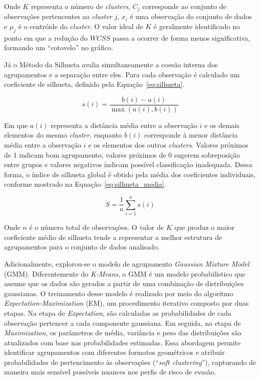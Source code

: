 Onde $K$ representa o número de \textit{clusters}, $C_j$ corresponde ao conjunto de observações pertencentes ao \textit{cluster} $j$, $x_i$ é uma observação do conjunto de dados e $\mu_j$ é o centróide do \textit{cluster}. O valor ideal de $K$ é geralmente identificado no ponto em que a redução do $WCSS$ passa a ocorrer de forma menos significativa, formando um ``cotovelo'' no gráfico.

Já o Método da Silhueta avalia simultaneamente a coesão interna dos agrupamentos e a separação entre eles. Para cada observação é calculado um coeficiente de silhueta, definido pela Equação~\ref{eq:silhueta}.

\begin{equation}
\label{eq:silhueta}
s(i) = \frac{b(i) - a(i)}{\max(a(i), b(i))}
\end{equation}

Em que $a(i)$ representa a distância média entre a observação $i$ e os demais elementos do mesmo \textit{cluster}, enquanto $b(i)$ corresponde à menor distância média entre a observação $i$ e os elementos dos outros \textit{clusters}. Valores próximos de 1 indicam bom agrupamento, valores próximos de 0 sugerem sobreposição entre grupos e valores negativos indicam possível classificação inadequada. Dessa forma, o índice de silhueta global é obtido pela média dos coeficientes individuais, conforme mostrado na Equação~\ref{eq:silhueta_media}.

\begin{equation}
\label{eq:silhueta_media}
S = \frac{1}{n}\sum_{i=1}^{n}s(i)
\end{equation}

Onde $n$ é o número total de observações. O valor de $K$ que produz o maior coeficiente médio de silhueta tende a representar a melhor estrutura de agrupamentos para o conjunto de dados analisado.

Adicionalmente, explorou-se o modelo de agrupamento \textit{Gaussian Mixture Model} (GMM). Diferentemente do \textit{K-Means}, o GMM é um modelo probabilístico que assume que os dados são gerados a partir de uma combinação de distribuições gaussianas. O treinamento desse modelo é realizado por meio do algoritmo \textit{Expectation-Maximization} (EM), um procedimento iterativo composto por duas etapas. Na etapa de \textit{Expectation}, são calculadas as probabilidades de cada observação pertencer a cada componente gaussiana. Em seguida, na etapa de \textit{Maximization}, os parâmetros de média, variância e peso das distribuições são atualizados com base nas probabilidades estimadas. Essa abordagem permite identificar agrupamentos com diferentes formatos geométricos e atribuir probabilidades de pertencimento às observações (``\textit{soft clustering}''), capturando de maneira mais sensível possíveis nuances nos perfis de risco de evasão.

